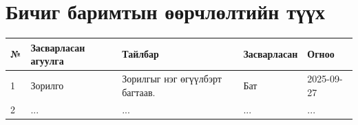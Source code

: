 \section*{Бичиг баримтын өөрчлөлтийн түүх}

\begin{longtable}{|l|l|p{4.5cm}|l|l|}
    \hline
    \bfseries № &
    \bfseries Засварласан агуулга &
    \bfseries Тайлбар &
    \bfseries Засварласан &
    \bfseries Огноо \\ \hline

    1 & Зорилго & Зорилгыг нэг өгүүлбэрт багтаав. & Бат & 2025-09-27 \\ \hline
    2 & ... & ... & ... & ... \\ \hline

\end{longtable}